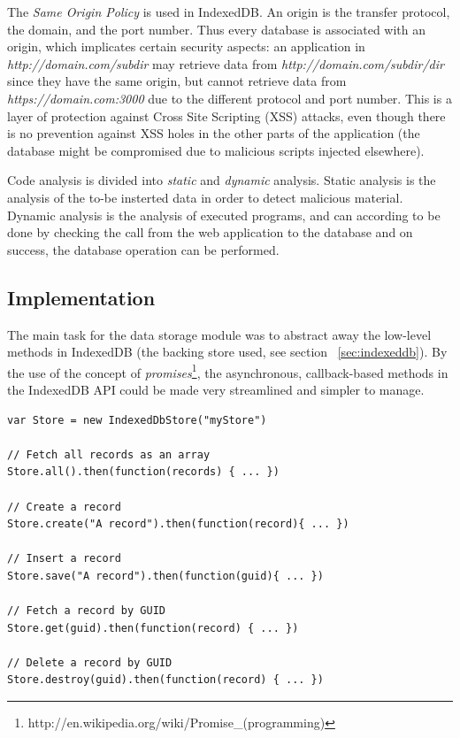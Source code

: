 The \emph{Same Origin Policy} is used in IndexedDB. An origin is the transfer protocol, the domain, and the port number. Thus every database is associated with an origin, which implicates certain security aspects: an application in \emph{http://domain.com/subdir} may retrieve data from \emph{http://domain.com/subdir/dir} since they have the same origin, but cannot retrieve data from \emph{https://domain.com:3000} due to the different protocol and port number. This is a layer of protection against Cross Site Scripting (XSS) attacks, even though there is no prevention against XSS holes in the other parts of the application (the database might be compromised due to malicious scripts injected elsewhere).

Code analysis is divided into \emph{static} and \emph{dynamic} analysis. Static analysis is the analysis of the to-be insterted data in order to detect malicious material. Dynamic analysis is the analysis of executed programs, and can according to \cite{IndexedDBSecurity:2012:Online} be done by checking the call from the web application to the database and on success, the database operation can be performed.

\subsection{Implementation}
The main task for the data storage module was to abstract away the low-level methods in IndexedDB (the backing store used, see section ~\ref{sec:indexeddb}). By the use of the concept of \emph{promises}\footnote{http://en.wikipedia.org/wiki/Promise\_(programming)}, the asynchronous, callback-based methods in the IndexedDB API could be made very streamlined and simpler to manage.

\begin{Code}
\begin{lstlisting}[caption=Common database operations]
var Store = new IndexedDbStore("myStore")

// Fetch all records as an array
Store.all().then(function(records) { ... })

// Create a record
Store.create("A record").then(function(record){ ... })

// Insert a record
Store.save("A record").then(function(guid){ ... })

// Fetch a record by GUID
Store.get(guid).then(function(record) { ... })

// Delete a record by GUID
Store.destroy(guid).then(function(record) { ... })
\end{lstlisting}
\end{Code}

